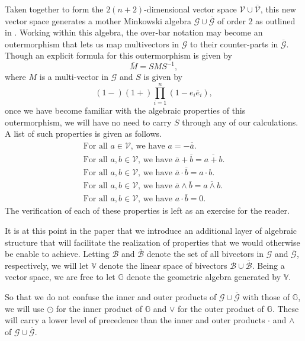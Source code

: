\documentclass{birkjour}
\theoremstyle{definition}
\theoremstyle{remark}
\numberwithin{equation}{section}
\newcommand{\V}{\mathcal{V}}
\newcommand{\G}{\mathcal{G}}
\newcommand{\B}{\mathcal{B}}
\newcommand{\Vb}{\overline{\mathcal{V}}}
\newcommand{\Gb}{\overline{\mathcal{G}}}
\newcommand{\Bb}{\overline{\mathcal{B}}}
\newcommand{\VB}{\mathbb{V}}
\newcommand{\GB}{\mathbb{G}}
\newcommand{\eb}{\overline{e}}
\begin{document}
Taken together to form the $2(n+2)$-dimensional vector space $\V\cup\Vb$, this new vector space
generates a mother Minkowski algebra $\G\cup\Gb$ of order 2 as outlined in \cite{}.
Working within this algebra, the over-bar notation may become an outermorphism
that lets us map multivectors in $\G$ to their counter-parts in $\Gb$.  Though an explicit formula
for this outermorphism is given by
\begin{equation*}
\overline{M} = SMS^{-1},
\end{equation*}
where $M$ is a multi-vector in $\G$ and $S$ is given by
\begin{equation*}
(1-)(1+)\prod_{i=1}^n(1-e_i\eb_i),
\end{equation*}
once we have become familiar with the algebraic properties of this outermorphism,
we will have no need to carry $S$ through any of our calculations.  A list of
such properties is given as follows.
\begin{equation*}
\begin{array}{l}
\mbox{For all $a\in\V$, we have $a=-\overline{\overline{a}}$.} \\
\mbox{For all $a,b\in\V$, we have $\overline{a}+\overline{b}=\overline{a+b}.$} \\
\mbox{For all $a,b\in\V$, we have $\overline{a}\cdot\overline{b}=a\cdot b$.} \\
\mbox{For all $a,b\in\V$, we have $\overline{a}\wedge\overline{b}=\overline{a\wedge b}$.} \\
\mbox{For all $a,b\in\V$, we have $a\cdot\overline{b}=0$.}
\end{array}
\end{equation*}
The verification of each of these properties is left as an exercise for the reader.

It is at this point in the paper that we introduce an additional layer of
algebraic structure that will facilitate the realization of properties that
we would otherwise be enable to achieve.  Letting $\B$ and $\Bb$ denote the
set of all bivectors in $\G$ and $\Gb$, respectively, we will let $\VB$ denote the linear space
of bivectors $\B\cup\Bb$.  Being a vector space, we are free to let $\GB$ denote the
geometric algebra generated by $\VB$.

So that we do not confuse the inner
and outer products of $\G\cup\Gb$ with those of $\GB$, we will use $\odot$ for the
inner product of $\GB$ and $\vee$ for the outer product of $\GB$.  These
will carry a lower level of precedence than the inner and outer products $\cdot$
and $\wedge$ of $\G\cup\Gb$.
\end{document}
